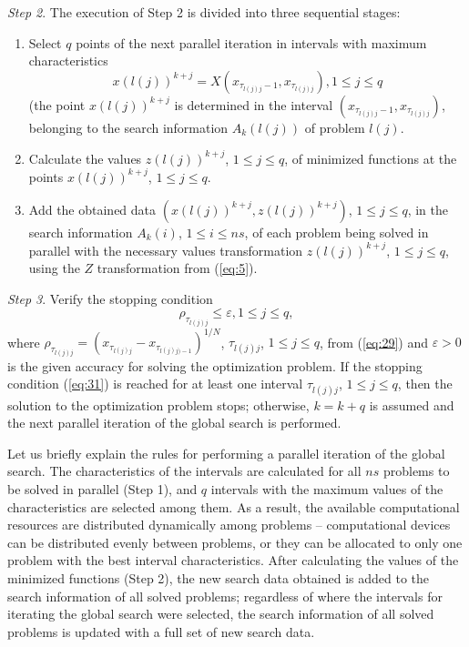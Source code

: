 \documentclass[review]{elsarticle}
\begin{document}
\textit{Step 2}. The execution of Step 2 is divided into three sequential stages: 
\begin{enumerate}
	 
	\item Select $q$ points of the next parallel iteration in intervals with maximum characteristics
\begin{equation}\label{eq:30}
 x(l(j))^{k+j}=X(x_{\tau_{l(j)j}-1},x_{\tau_{l(j)j}}),1 \leq j \leq q	
\end{equation}
(the point $x(l(j))^{k+j}$ is determined in the interval $(x_{\tau_{l(j)j}-1},x_{\tau_{l(j)j}})$, belonging to the search information $A_k (l(j))$ of problem $l(j)$.

	\item Calculate the values $z(l(j))^{k+j}$, $1 \leq j \leq q$, of minimized functions at the points $x(l(j))^{k+j}$, $1 \leq j \leq q$.
	
  \item Add the obtained data $(x(l(j))^{k+j}, z(l(j))^{k+j})$, $1 \leq j \leq q$, in the search information $A_k(i)$, $1 \leq i \leq ns$, of each problem being solved in parallel with the necessary values transformation $z(l(j))^{k+j}$, $1 \leq j \leq q$, using the $Z$ transformation from (\ref{eq:5}).

\end{enumerate}

\textit{Step 3}. Verify the stopping condition
\begin{equation}\label{eq:31}
\rho_{\tau_{l(j)j}} \leq \varepsilon, 1 \leq j \leq q,
\end{equation}
where $\rho_{\tau_{l(j)j}} = (x_{\tau_{l(j)j}} - x_{\tau_{l(j)j)-1}} )^{1/N}$, $\tau_{l(j)j}$, $1 \leq j \leq q$, from (\ref{eq:29}) and $\varepsilon > 0$ is the given accuracy for solving the optimization problem. If the stopping condition (\ref{eq:31}) is reached for at least one interval $\tau_{l(j)j}$, $1 \leq j \leq q$, then the solution to the optimization problem stops; otherwise, $k=k+q$ is assumed and the next parallel iteration of the global search is performed. 

Let us briefly explain the rules for performing a parallel iteration of the global search. The characteristics of the intervals are calculated for all $ns$ problems to be solved in parallel (Step 1), and $q$ intervals with the maximum values of the characteristics are selected among them. As a result, the available computational resources are distributed dynamically among problems -- computational devices can be distributed evenly between problems, or they can be allocated to only one problem with the best interval characteristics. After calculating the values of the minimized functions (Step 2), the new search data obtained is added to the search information of all solved problems; regardless of where the intervals for iterating the global search were selected, the search information of all solved problems is updated with a full set of new search data.
\end{document}
